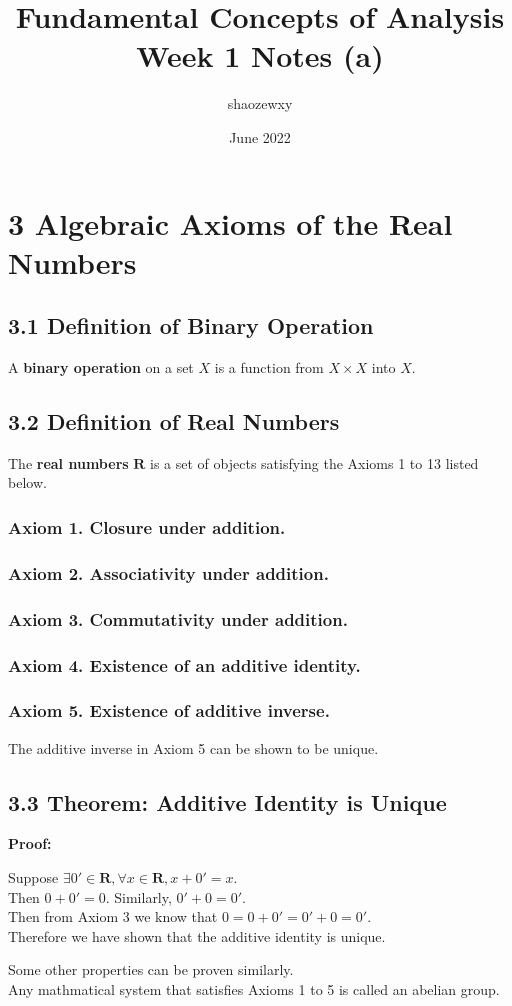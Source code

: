 \documentclass{article}
\title{Fundamental Concepts of Analysis\\
\large{Week 1 Notes (a)}}
\author{shaozewxy }
\date{June 2022}
\begin{document}
\maketitle

\setcounter{secnumdepth}{0}
\section*{3 Algebraic Axioms of the Real Numbers}
\subsection*{3.1 Definition of Binary Operation}
A \textbf{binary operation} on a set $X$ is a function from $X \times X$ into $X$.
\subsection*{3.2 Definition of Real Numbers}
The \textbf{real numbers} $\mathbf{R}$ is a set of objects satisfying the Axioms 1 to 13 listed below.
\subsubsection*{Axiom 1. Closure under addition.}
\subsubsection*{Axiom 2. Associativity under addition.}
\subsubsection*{Axiom 3. Commutativity under addition.}
\subsubsection*{Axiom 4. Existence of an additive identity.}
\subsubsection*{Axiom 5. Existence of additive inverse.}
The additive inverse in Axiom 5 can be shown to be unique.
\subsection*{3.3 Theorem: Additive Identity is Unique}
\textbf{Proof:}
\begin{addmargin}[1em]{0em}
    Suppose $\exists 0' \in \mathbf{R}, \forall x \in \mathbf{R}, x + 0' = x$.\\
    Then $0 + 0' = 0$. Similarly, $0' + 0 = 0'$.\\
    Then from Axiom 3 we know that $0 = 0 + 0' = 0' + 0 = 0'$.\\
    Therefore we have shown that the additive identity is unique.
\end{addmargin}
Some other properties can be proven similarly.\\
Any mathmatical system that satisfies Axioms 1 to 5 is called an abelian group.
\end{document}
